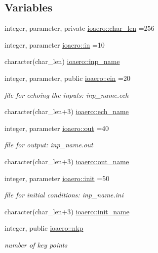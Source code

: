 \subsection*{Variables}
\begin{DoxyCompactItemize}
\item 
integer, parameter, private \hyperlink{namespaceioaero_acd6bdfdcfd986fd1c26261e5996e3b03}{ioaero\+::char\+\_\+len} =256
\item 
integer, parameter \hyperlink{namespaceioaero_a09d53f15b1a2c723ad2b4df01c16bccc}{ioaero\+::in} =10
\item 
character(char\+\_\+len) \hyperlink{namespaceioaero_ae3b39e5c092106ddc3bb8b81daf8bd13}{ioaero\+::inp\+\_\+name}
\item 
integer, parameter, public \hyperlink{namespaceioaero_a6a4b9f5362e2eee64e5777786065f563}{ioaero\+::ein} =20
\begin{DoxyCompactList}\small\item\em file for echoing the inputs\+: inp\+\_\+name.\+ech \end{DoxyCompactList}\item 
character(char\+\_\+len+3) \hyperlink{namespaceioaero_a175dde142a22987a0e59b9738444d2e3}{ioaero\+::ech\+\_\+name}
\item 
integer, parameter \hyperlink{namespaceioaero_a7c01d4bcd841d8d6281f29d5fc818fd8}{ioaero\+::out} =40
\begin{DoxyCompactList}\small\item\em file for output\+: inp\+\_\+name.\+out \end{DoxyCompactList}\item 
character(char\+\_\+len+3) \hyperlink{namespaceioaero_a6693b9440660a84d2d2fc41ac183bb0f}{ioaero\+::out\+\_\+name}
\item 
integer, parameter \hyperlink{namespaceioaero_afb3050696f2887599d4083672103b6e7}{ioaero\+::init} =50
\begin{DoxyCompactList}\small\item\em file for initial conditions\+: inp\+\_\+name.\+ini \end{DoxyCompactList}\item 
character(char\+\_\+len+3) \hyperlink{namespaceioaero_a5a12b8b21f86b26e7364428778a85d0b}{ioaero\+::init\+\_\+name}
\item 
integer, public \hyperlink{namespaceioaero_a24506866304c39bd1fa57ef73b124335}{ioaero\+::nkp}
\begin{DoxyCompactList}\small\item\em number of key points \end{DoxyCompactList}\item 

\end{DoxyCompactItemize}
